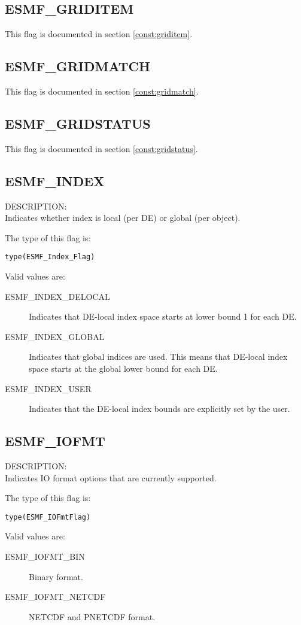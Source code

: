 \subsection{ESMF\_GRIDITEM}
This flag is documented in section \ref{const:griditem}.

\subsection{ESMF\_GRIDMATCH}
This flag is documented in section \ref{const:gridmatch}.

\subsection{ESMF\_GRIDSTATUS}
This flag is documented in section \ref{const:gridstatus}.

\subsection{ESMF\_INDEX}
\label{const:indexflag}
{\sf DESCRIPTION:\\}
Indicates whether index is local (per DE) or global (per object).

The type of this flag is:

{\tt type(ESMF\_Index\_Flag)}

Valid values are:
\begin{description}
\item [ESMF\_INDEX\_DELOCAL]
      Indicates that DE-local index space starts at lower bound 1 for each DE.
\item [ESMF\_INDEX\_GLOBAL]
      Indicates that global indices are used. This means that DE-local index
      space starts at the global lower bound for each DE.
\item [ESMF\_INDEX\_USER]
      Indicates that the DE-local index bounds are explicitly set by the user.
\end{description}

\subsection{ESMF\_IOFMT}
\label{opt:iofmtflag}
{\sf DESCRIPTION:\\}
Indicates IO format options that are currently supported.

The type of this flag is:

{\tt type(ESMF\_IOFmtFlag)}

Valid values are:
\begin{description}
\item [ESMF\_IOFMT\_BIN]
      Binary format.
\item [ESMF\_IOFMT\_NETCDF]
      NETCDF and PNETCDF format.
\end{description}

